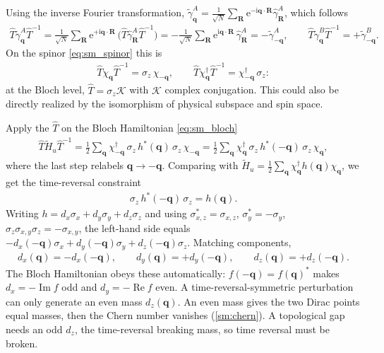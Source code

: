 \documentclass[
  aps,
  prl,
  preprint,
  amsmath,
  amssymb,
  superscriptaddress,
  floatfix
]{revtex4-2}
\newcommand{\ii}{\mathrm{i}}
\newcommand{\ee}{\mathrm{e}}
\newcommand{\oga}{\hat \gamma}
\newcommand{\oT}{\hat{T}}
\begin{document}
Using the inverse Fourier transformation,
$\tilde\gamma^A_{\bm q}=\tfrac{1}{\sqrt N}\sum_{\bm R}\ee^{-\ii\bm
q\cdot\bm R}\oga^A_{\bm R}$, which follows
\begin{align}
  \oT \tilde{\gamma}_{\bm q}^A \oT^{-1}
  = \frac{1}{\sqrt{N}} \sum_{\bm R} \ee^{+\ii \bm q \cdot \bm R}\,\big(\oT\oga_{\bm R}^A\oT^{-1}\big)
  = -\frac{1}{\sqrt{N}} \sum_{\bm R} \ee^{\ii \bm q \cdot \bm R}\, \oga_{\bm R}^A
  = - \tilde{\gamma}_{-\bm q}^A ,
  \qquad
  \oT \tilde{\gamma}_{\bm q}^B \oT^{-1} = + \tilde{\gamma}_{-\bm q}^B .
\end{align}
On the spinor \cref{eq:sm_spinor} this is
\begin{align}
  \oT \chi_{\bm q} \oT^{-1} = \sigma_z\, \chi_{-\bm q},
  \qquad
  \oT \chi_{\bm q}^\dag \oT^{-1} = \chi_{-\bm q}^\dag\, \sigma_z :
\end{align}
at the Bloch level, $\oT=\sigma_z\mathcal K$ with $\mathcal K$ complex
conjugation. This could also be directly realized by the isomorphism of physical subspace and spin space.

Apply the $\hat{T}$ on the Bloch Hamiltonian \cref{eq:sm_bloch}
\begin{align}
  \oT \tilde{H}_u \oT^{-1}
  = \frac{1}{2} \sum_{\bm q} \chi_{-\bm q}^\dag\, \sigma_z\, h^*(\bm q)\, \sigma_z\, \chi_{-\bm q}
  = \frac{1}{2} \sum_{\bm q} \chi_{\bm q}^\dag\, \sigma_z\, h^*(-\bm q)\, \sigma_z\, \chi_{\bm q},
\end{align}
where the last step relabels $\bm q\to-\bm q$. Comparing with
$\tilde{H}_u=\tfrac12\sum_{\bm q}\chi^\dag_{\bm q}h(\bm q)\chi_{\bm q}$,
we get the time-reversal constraint
\begin{align}
  \sigma_z\, h^*(-\bm q)\, \sigma_z = h(\bm q).
  \label{eq:sm_TRS_constraint}
\end{align}
Writing $h=d_x\sigma_x+d_y\sigma_y+d_z\sigma_z$ and using
$\sigma_{x,z}^*=\sigma_{x,z}$, $\sigma_y^*=-\sigma_y$,
$\sigma_z\sigma_{x,y}\sigma_z=-\sigma_{x,y}$, the left-hand side equals
$-d_x(-\bm q)\sigma_x+d_y(-\bm q)\sigma_y+d_z(-\bm q)\sigma_z$. Matching
components,
\begin{align}
  d_x(\bm q) = -d_x(-\bm q), \qquad d_y(\bm q) = +d_y(-\bm q), \qquad d_z(\bm q) = +d_z(-\bm q).
  \label{eq:sm_d_parity}
\end{align}
The Bloch Hamiltonian obeys these automatically: $f(-\bm q)=f(\bm
q)^*$ makes $d_x=-\operatorname{Im}f$ odd and $d_y=-\operatorname{Re}f$
even. A
time-reversal-symmetric perturbation can only generate an even mass
$d_z(\bm q)$. An even mass gives the two Dirac points equal masses, then the
Chern number vanishes (\cref{sm:chern}). A topological gap needs an odd
$d_z$, the time-reversal breaking mass, so time reversal must be broken.
\end{document}
